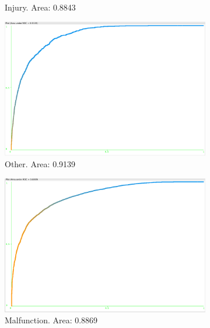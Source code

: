 \documentclass[11pt, notitlepage,abstracton,oneside]{article}   	%
\begin{document}
\begin{figure}[H]
\begin{subfigure}[b]{0.3\textwidth}
        \caption{Injury. Area: 0.8843}
        \label{fig:injury}
    \end{subfigure}
    \hfill
    \begin{subfigure}[b]{0.3\textwidth}
        \centering
        \includegraphics[width=\textwidth]{figures/other}
        \caption{Other. Area: 0.9139}
        \label{fig:other}
    \end{subfigure}    
    \begin{subfigure}[b]{0.4\textwidth}
        \centering
        \includegraphics[width=\textwidth]{figures/malfunction}
        \caption{Malfunction. Area: 0.8869}
        \label{fig:injury}
    \end{subfigure} 
    \begin{subfigure}[b]{0.4\textwidth}
        \centering

\end{subfigure}
\end{figure}
\end{document}
